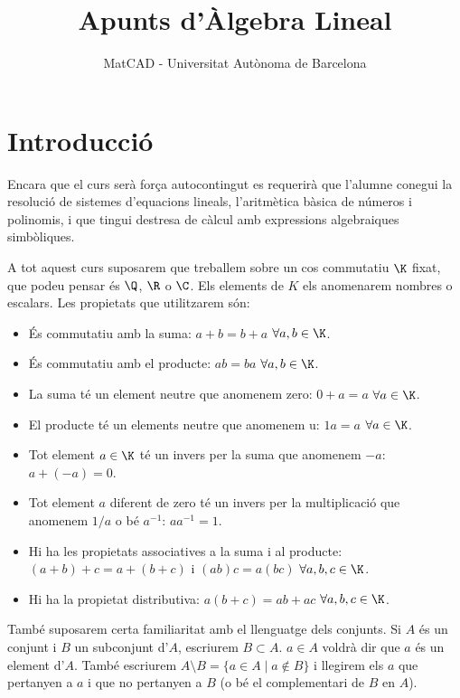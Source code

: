 \documentclass[a4paper,12pt,twoside]{article}
\title{Apunts d'Àlgebra Lineal}
\author{MatCAD - Universitat Autònoma de Barcelona}
\newcommand{\1}{\mathbf{1}}
\newcommand{\0}{\mathbf{0}}
\theoremstyle{definition}
\theoremstyle{remark}
\begin{document}
\maketitle
\tableofcontents
\section{Introducció}
Encara que el curs serà força autocontingut es requerirà que l'alumne conegui la resolució de sistemes d'equacions lineals, l'aritmètica bàsica de números i polinomis, i que tingui destresa de càlcul amb expressions algebraiques simbòliques.

A tot aquest curs suposarem que treballem sobre un cos commutatiu $\K$ fixat, que podeu pensar és $\Q$, $\R$ o $\C$. Els elements de $K$ els anomenarem nombres o escalars. Les propietats que utilitzarem són:
\begin{itemize}
	\item És commutatiu amb la suma: $a+b=b+a$ $\forall a,b\in \K$.
	\item És commutatiu amb el producte: $ab=ba$ $\forall a,b\in \K$.
	\item La suma té un element neutre que anomenem zero: $0+a=a$ $\forall a\in\K$.
	\item El producte té un elements neutre que anomenem u: $1a=a$ $\forall a\in\K$.
	\item Tot element $a\in\K$ té un invers per la suma que anomenem $-a$: $a+(-a)=0$.
	\item Tot element $a$ diferent de zero té un invers per la multiplicació que anomenem $1/a$ o bé $a^{-1}$: $a a^{-1}=1$.
	\item Hi ha les propietats associatives a la suma i al producte: $(a+b)+c=a+(b+c)$ i $(ab)c=a(bc)$ $\forall a,b,c \in \K$.
	\item Hi ha la propietat distributiva: $a(b+c)=ab+ac$ $\forall a,b,c \in \K$.
\end{itemize}

També suposarem certa familiaritat amb el llenguatge dels conjunts. Si $A$ és un conjunt i $B$ un subconjunt d'$A$, escriurem $B\subset A$. $a\in A$ voldrà dir que $a$ és un element d'$A$. També escriurem $A\setminus B=\{a \in A \mid a \not\in B\}$ i llegirem els $a$ que pertanyen a $a$ i que no pertanyen a $B$ (o bé el complementari de $B$ en $A$). 

 
\end{document}
